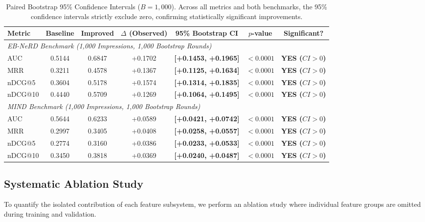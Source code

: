 \documentclass[11pt,a4paper]{article}
\begin{document}
\begin{table}[htbp]
\centering
\small
\setlength{\tabcolsep}{3.2pt}
\begin{tabular}{lcccccc}
\toprule
\textbf{Metric} & \textbf{Baseline} & \textbf{Improved} & \textbf{$\Delta$ (Observed)} & \textbf{95\% Bootstrap CI} & \textbf{$p$-value} & \textbf{Significant?} \\
\midrule
\multicolumn{7}{l}{\textit{EB-NeRD Benchmark (1,000 Impressions, 1,000 Bootstrap Rounds)}} \\
AUC      & 0.5144 & 0.6847 & +0.1702 & \textbf{[+0.1453, +0.1965]} & $< 0.0001$ & \textbf{YES ($CI > 0$)} \\
MRR      & 0.3211 & 0.4578 & +0.1367 & \textbf{[+0.1125, +0.1634]} & $< 0.0001$ & \textbf{YES ($CI > 0$)} \\
nDCG@5   & 0.3604 & 0.5178 & +0.1574 & \textbf{[+0.1314, +0.1835]} & $< 0.0001$ & \textbf{YES ($CI > 0$)} \\
nDCG@10  & 0.4440 & 0.5709 & +0.1269 & \textbf{[+0.1064, +0.1495]} & $< 0.0001$ & \textbf{YES ($CI > 0$)} \\
\midrule
\multicolumn{7}{l}{\textit{MIND Benchmark (1,000 Impressions, 1,000 Bootstrap Rounds)}} \\
AUC      & 0.5644 & 0.6233 & +0.0589 & \textbf{[+0.0421, +0.0742]} & $< 0.0001$ & \textbf{YES ($CI > 0$)} \\
MRR      & 0.2997 & 0.3405 & +0.0408 & \textbf{[+0.0258, +0.0557]} & $< 0.0001$ & \textbf{YES ($CI > 0$)} \\
nDCG@5   & 0.2774 & 0.3160 & +0.0386 & \textbf{[+0.0233, +0.0533]} & $< 0.0001$ & \textbf{YES ($CI > 0$)} \\
nDCG@10  & 0.3450 & 0.3818 & +0.0369 & \textbf{[+0.0240, +0.0487]} & $< 0.0001$ & \textbf{YES ($CI > 0$)} \\
\bottomrule
\end{tabular}
\caption{Paired Bootstrap 95\% Confidence Intervals ($B=1,000$). Across all metrics and both benchmarks, the 95\% confidence intervals strictly exclude zero, confirming statistically significant improvements.}
\label{tab:paired_bootstrap}
\end{table}

\subsection{Systematic Ablation Study}
To quantify the isolated contribution of each feature subsystem, we perform an ablation study where individual feature groups are omitted during training and validation.
\end{document}
